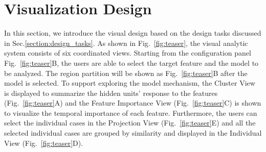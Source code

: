 \section{Visualization Design}


In this section, we introduce the visual design based on the design tasks discussed in Sec.\ref{section:design_tasks}.  As shown in Fig.~\ref{fig:teaser}, the visual analytic system consists of six coordinated views. Starting from the configuration panel Fig.~\ref{fig:teaser}B, the users are able to select the target feature and the model to be analyzed. The region partition will be shown as Fig.~\ref{fig:teaser}B after the model is selected. To support exploring the model mechanism, the Cluster View is displayed to summarize the hidden units' response to the features (Fig.~\ref{fig:teaser}A) and the Feature Importance View (Fig.~\ref{fig:teaser}C) is shown to visualize the temporal importance of each feature. Furthermore, the users can select the individual cases in the Projection View (Fig.~\ref{fig:teaser}E) and all the selected individual cases are grouped by similarity and displayed in the Individual View (Fig.~\ref{fig:teaser}D).



